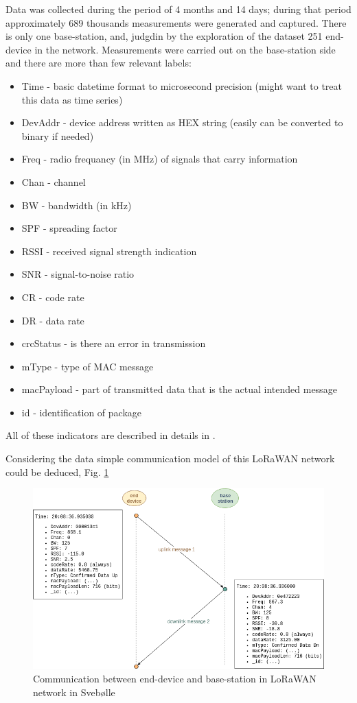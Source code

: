\documentclass[10pt, a4paper]{article} %
\begin{document}
Data was collected during the period of 4 months and 14 days; during that period approximately 689 thousands measurements were generated and captured. 
There is only one base-station, and, judgdin by the exploration of the dataset 251 end-device in the network.
Measurements were carried out on the base-station side and there are more than few relevant labels:
\begin{itemize}
	\item Time - basic datetime format to microsecond precision (might want to treat this data as time series)
    \item DevAddr - device address written as HEX string (easily can be converted to binary if needed)
    \item Freq - radio frequancy (in MHz) of signals that carry information
    \item Chan - channel
    \item BW - bandwidth (in kHz)
    \item SPF - spreading factor
    \item RSSI - received signal strength indication
    \item SNR - signal-to-noise ratio
    \item CR - code rate 
    \item DR - data rate
    \item crcStatus - is there an error in transmission
    \item mType - type of MAC message
    \item macPayload - part of transmitted data that is the actual intended message
    \item id - identification of package
\end{itemize}

All of these indicators are described in details in \cite{Aloys_LoRa}.

Considering the data simple communication model of this LoRaWAN network could be deduced, Fig. \ref{communication}
\begin{figure}
	\centering
	\includegraphics[scale=.5]{images/Svebolle-ed-bs-model.png} %
	\caption{Communication between end-device and base-station in LoRaWAN network in Svebølle} %
	\label{communication} 
\end{figure}
\end{document}
